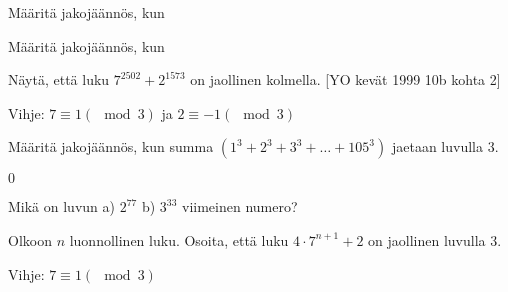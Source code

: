 \begin{tehtavasivu}

\begin{tehtava}
  Määritä jakojäännös, kun
  \begin{vastaus}
  \end{vastaus}
\end{tehtava}


\begin{tehtava}
  Määritä jakojäännös, kun
  \begin{vastaus}
  \end{vastaus}
\end{tehtava}

\begin{tehtava}
  Näytä, että luku $7^{2502} + 2^{1573}$ on jaollinen kolmella. [YO kevät 1999 10b kohta 2]
  \begin{vastaus}
  Vihje: $7 \equiv 1 (\mod{3})$ ja $2 \equiv -1 (\mod{3})$
  \end{vastaus}
\end{tehtava}

\begin{tehtava}
  Määritä jakojäännös, kun summa $(1^3 + 2^3 + 3^3 + \ldots + 105^3)$ jaetaan luvulla $3$.
  \begin{vastaus}
  $0$
  \end{vastaus}
\end{tehtava}

\begin{tehtava}
  Mikä on luvun a) $2^{77}$ b) $3^{33}$ viimeinen numero?
  \begin{vastaus}
  \end{vastaus}
\end{tehtava}

\begin{tehtava}
  Olkoon $n$ luonnollinen luku. Osoita, että luku $4\cdot 7^{n+1}+2$ on jaollinen luvulla $3$.
  \begin{vastaus}
      Vihje: $7 \equiv 1 (\mod{3})$
  \end{vastaus}
\end{tehtava}


\end{tehtavasivu}
